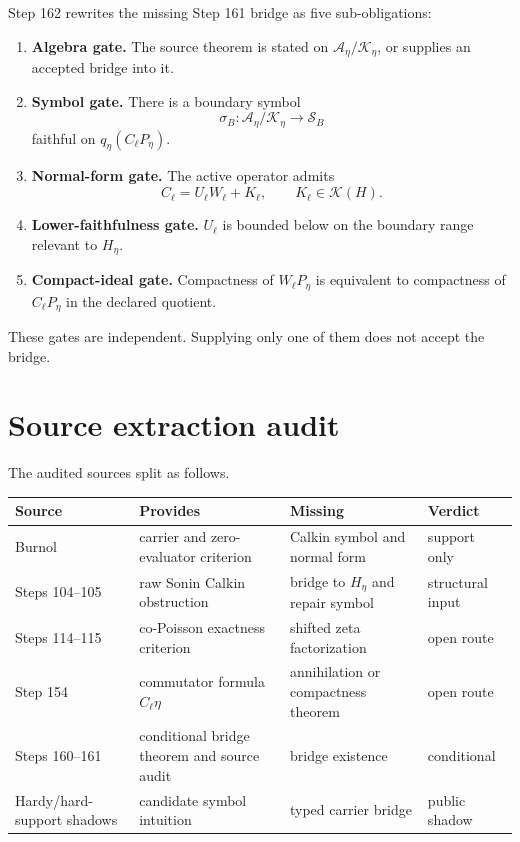 \documentclass[11pt]{article}
\begin{document}
Step 162 rewrites the missing Step 161 bridge as five sub-obligations:
\begin{enumerate}[label=(G\arabic*)]
  \item \textbf{Algebra gate.} The source theorem is stated on
  \(\mathcal A_\eta/\mathcal K_\eta\), or supplies an accepted bridge into it.
  \item \textbf{Symbol gate.} There is a boundary symbol
  \[
    \sigma_B:\mathcal A_\eta/\mathcal K_\eta\to\mathcal S_B
  \]
  faithful on \(q_\eta(C_\ell P_\eta)\).
  \item \textbf{Normal-form gate.} The active operator admits
  \[
    C_\ell=U_\ell W_\ell+K_\ell,
    \qquad
    K_\ell\in\mathcal K(H).
  \]
  \item \textbf{Lower-faithfulness gate.} \(U_\ell\) is bounded below on the
  boundary range relevant to \(H_\eta\).
  \item \textbf{Compact-ideal gate.} Compactness of \(W_\ell P_\eta\) is
  equivalent to compactness of \(C_\ell P_\eta\) in the declared quotient.
\end{enumerate}

These gates are independent.  Supplying only one of them does not accept the
bridge.

\section{Source extraction audit}

The audited sources split as follows.

\begin{center}
\begin{tabular}{llll}
\hline
Source & Provides & Missing & Verdict\\
\hline
Burnol & carrier and zero-evaluator criterion & Calkin symbol and normal form & support only\\
Steps 104--105 & raw Sonin Calkin obstruction & bridge to \(H_\eta\) and repair symbol & structural input\\
Steps 114--115 & co-Poisson exactness criterion & shifted zeta factorization & open route\\
Step 154 & commutator formula \(C_\ell\eta\) & annihilation or compactness theorem & open route\\
Steps 160--161 & conditional bridge theorem and source audit & bridge existence & conditional\\
Hardy/hard-support shadows & candidate symbol intuition & typed carrier bridge & public shadow\\
\hline
\end{tabular}
\end{center}
\end{document}
